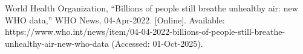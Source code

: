 \documentclass[conference]{IEEEtran}
\begin{document}
\begin{comment}
Number footnotes separately in superscripts. Place the actual footnote at 
the bottom of the column in which it was cited. Do not put footnotes in the 
abstract or reference list. Use letters for table footnotes.

Unless there are six authors or more give all authors' names; do not use 
``et al.''. Papers that have not been published, even if they have been 
submitted for publication, should be cited as ``unpublished'' \cite{b4}. Papers 
that have been accepted for publication should be cited as ``in press'' \cite{b5}. 
Capitalize only the first word in a paper title, except for proper nouns and 
element symbols.

For papers published in translation journals, please give the English 
citation first, followed by the original foreign-language citation \cite{b6}.
\end{comment}
\begin{thebibliography}{00}
  World Health Organization, “Billions of people still breathe unhealthy air: new WHO data,” WHO News, 04-Apr-2022. [Online]. Available: https://www.who.int/news/item/04-04-2022-billions-of-people-still-breathe-unhealthy-air-new-who-data  (Accessed: 01-Oct-2025).
\begin{comment}
    \bibitem{b2} J. Clerk Maxwell, A Treatise on Electricity and Magnetism, 3rd ed., vol. 2. Oxford: Clarendon, 1892, pp.68--73.
\bibitem{b3} I. S. Jacobs and C. P. Bean, ``Fine particles, thin films and exchange anisotropy,'' in Magnetism, vol. III, G. T. Rado and H. Suhl, Eds. New York: Academic, 1963, pp. 271--350.
\bibitem{b4} K. Elissa, ``Title of paper if known,'' unpublished.
\bibitem{b5} R. Nicole, ``Title of paper with only first word capitalized,'' J. Name Stand. Abbrev., in press.
\bibitem{b6} Y. Yorozu, M. Hirano, K. Oka, and Y. Tagawa, ``Electron spectroscopy studies on magneto-optical media and plastic substrate interface,'' IEEE Transl. J. Magn. Japan, vol. 2, pp. 740--741, August 1987 [Digests 9th Annual Conf. Magnetics Japan, p. 301, 1982].
\bibitem{b7} M. Young, The Technical Writer's Handbook. Mill Valley, CA: University Science, 1989.
\end{comment}

\end{thebibliography}
\vspace{12pt}
\end{document}
